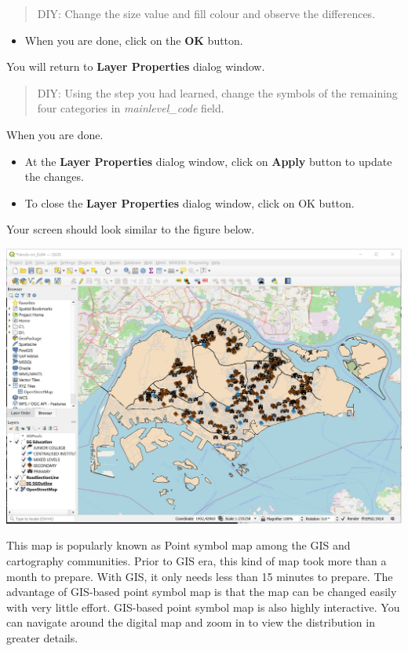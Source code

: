 \documentclass[
  letterpaper,
  DIV=11,
  numbers=noendperiod]{scrreprt}
\providecommand{\tightlist}{%
  \setlength{\itemsep}{0pt}\setlength{\parskip}{0pt}}\usepackage{longtable,booktabs,array}
\begin{document}
\begin{quote}
DIY: Change the size value and fill colour and observe the differences.
\end{quote}

\begin{itemize}
\tightlist
\item
  When you are done, click on the \textbf{OK} button.
\end{itemize}

You will return to \textbf{Layer Properties} dialog window.

\begin{quote}
DIY: Using the step you had learned, change the symbols of the remaining
four categories in \emph{mainlevel\_code} field.
\end{quote}

When you are done.

\begin{itemize}
\tightlist
\item
  At the \textbf{Layer Properties} dialog window, click on
  \textbf{Apply} button to update the changes.
\item
  To close the \textbf{Layer Properties} dialog window, click on OK
  button.
\end{itemize}

Your screen should look similar to the figure below.

\includegraphics{./img03/image9.jpg}

This map is popularly known as Point symbol map among the GIS and
cartography communities. Prior to GIS era, this kind of map took more
than a month to prepare. With GIS, it only needs less than 15 minutes to
prepare. The advantage of GIS-based point symbol map is that the map can
be changed easily with very little effort. GIS-based point symbol map is
also highly interactive. You can navigate around the digital map and
zoom in to view the distribution in greater details.
\end{document}
